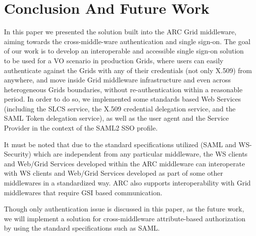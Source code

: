 \documentclass[twocolumn]{svjour3}         %
\begin{document}
\section{Conclusion And Future Work}
\label{sec:conclusion}
In this paper we presented the solution built into the ARC Grid middleware, aiming towards the cross-middle-ware authentication and single sign-on. The goal of our work is to develop an interoperable and accessible single sign-on solution to be used for a VO scenario in production Grids, where users can easily authenticate against the Grids with any of their credentials (not only X.509) from anywhere, and move inside Grid middleware infrastructure and even across heterogeneous Grids  boundaries, without re-authentication within a reasonable period. In order to do so, we implemented some standards based Web Services (including the SLCS service, the X.509 credential delegation service, and the SAML Token delegation service), as well as the user agent and the Service Provider in the context of the SAML2 SSO profile.

It must be noted that due to the standard specifications utilized (SAML and WS-Security) which are independent from any particular middleware, the WS clients and Web/Grid Services developed within the ARC middleware can interoperate with WS clients and Web/Grid Services developed as part of some other middlewares in a standardized way. ARC also supports interoperability with Grid middlewares that require GSI based communication.

Though only authentication issue is discussed in this paper, as the future work, we will implement a solution for cross-middleware attribute-based authorization by using the standard specifications such as SAML.


\end{document}
